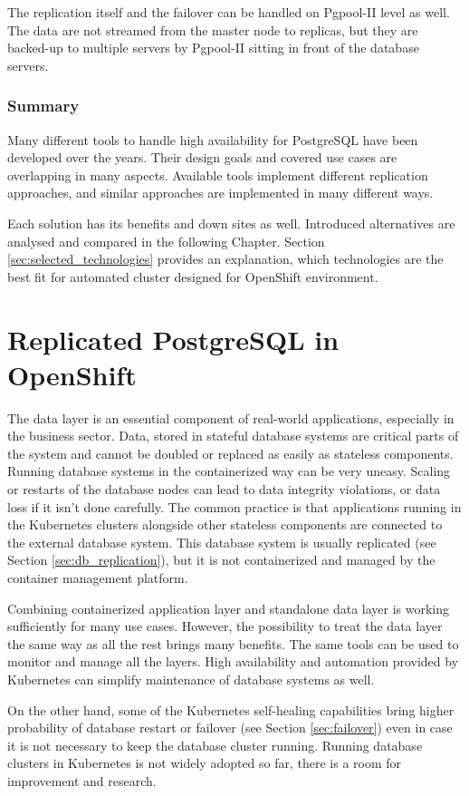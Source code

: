 \documentclass[
  digital, %
  twoside, %
  table,   %
  nolof,   %
  nolot,   %
]{fithesis3}
\begin{document}
The replication itself and the failover can be handled on Pgpool-II level as well. The data are not streamed from the master node to replicas, but they are backed-up to multiple servers by Pgpool-II sitting in front of the database servers.

\subsection{Summary}
Many different tools to handle high availability for PostgreSQL have been developed over the years. Their design goals and covered use cases are overlapping in many aspects. Available tools implement different replication approaches, and similar approaches are implemented in many different ways.

Each solution has its benefits and down sites as well. Introduced alternatives are analysed and compared in the following Chapter. Section \ref{sec:selected_technologies} provides an explanation, which technologies are the best fit for automated cluster designed for OpenShift environment.


\chapter{Replicated PostgreSQL in OpenShift} \label{chap:pg_in_openshift}
The data layer is an essential component of real-world applications, especially in the business sector. Data, stored in stateful database systems are critical parts of the system and cannot be doubled or replaced as easily as stateless components. Running database systems in the containerized way can be very uneasy. Scaling or restarts of the database nodes can lead to data integrity violations, or data loss if it isn't done carefully. The common practice is that applications running in the Kubernetes clusters alongside other stateless components are connected to the external database system. This database system is usually replicated (see Section \ref{sec:db_replication}), but it is not containerized and managed by the container management platform.

Combining containerized application layer and standalone data layer is working sufficiently for many use cases. However, the possibility to treat the data layer the same way as all the rest brings many benefits. The same tools can be used to monitor and manage all the layers. High availability and automation provided by Kubernetes can simplify maintenance of database systems as well.

On the other hand, some of the Kubernetes self-healing capabilities bring higher probability of database restart or failover (see Section \ref{sec:failover}) even in case it is not necessary to keep the database cluster running. Running database clusters in Kubernetes is not widely adopted so far, there is a room for improvement and research.
\end{document}
